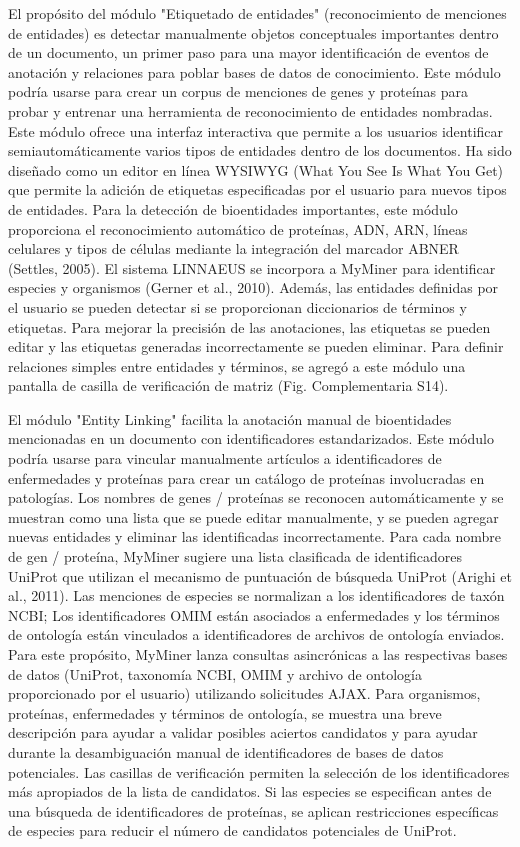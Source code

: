 El propósito del módulo "Etiquetado de entidades" (reconocimiento de menciones de entidades) es detectar manualmente objetos conceptuales importantes dentro de un documento, un primer paso para una mayor identificación de eventos de anotación y relaciones para poblar bases de datos de conocimiento. Este módulo podría usarse para crear un corpus de menciones de genes y proteínas para probar y entrenar una herramienta de reconocimiento de entidades nombradas. Este módulo ofrece una interfaz interactiva que permite a los usuarios identificar semiautomáticamente varios tipos de entidades dentro de los documentos. Ha sido diseñado como un editor en línea WYSIWYG (What You See Is What You Get) que permite la adición de etiquetas especificadas por el usuario para nuevos tipos de entidades. Para la detección de bioentidades importantes, este módulo proporciona el reconocimiento automático de proteínas, ADN, ARN, líneas celulares y tipos de células mediante la integración del marcador ABNER (Settles, 2005). El sistema LINNAEUS se incorpora a MyMiner para identificar especies y organismos (Gerner et al., 2010). Además, las entidades definidas por el usuario se pueden detectar si se proporcionan diccionarios de términos y etiquetas. Para mejorar la precisión de las anotaciones, las etiquetas se pueden editar y las etiquetas generadas incorrectamente se pueden eliminar. Para definir relaciones simples entre entidades y términos, se agregó a este módulo una pantalla de casilla de verificación de matriz (Fig. Complementaria S14).

El módulo "Entity Linking" facilita la anotación manual de bioentidades mencionadas en un documento con identificadores estandarizados. Este módulo podría usarse para vincular manualmente artículos a identificadores de enfermedades y proteínas para crear un catálogo de proteínas involucradas en patologías. Los nombres de genes / proteínas se reconocen automáticamente y se muestran como una lista que se puede editar manualmente, y se pueden agregar nuevas entidades y eliminar las identificadas incorrectamente. Para cada nombre de gen / proteína, MyMiner sugiere una lista clasificada de identificadores UniProt que utilizan el mecanismo de puntuación de búsqueda UniProt (Arighi et al., 2011). Las menciones de especies se normalizan a los identificadores de taxón NCBI; Los identificadores OMIM están asociados a enfermedades y los términos de ontología están vinculados a identificadores de archivos de ontología enviados. Para este propósito, MyMiner lanza consultas asincrónicas a las respectivas bases de datos (UniProt, taxonomía NCBI, OMIM y archivo de ontología proporcionado por el usuario) utilizando solicitudes AJAX. Para organismos, proteínas, enfermedades y términos de ontología, se muestra una breve descripción para ayudar a validar posibles aciertos candidatos y para ayudar durante la desambiguación manual de identificadores de bases de datos potenciales. Las casillas de verificación permiten la selección de los identificadores más apropiados de la lista de candidatos. Si las especies se especifican antes de una búsqueda de identificadores de proteínas, se aplican restricciones específicas de especies para reducir el número de candidatos potenciales de UniProt.

